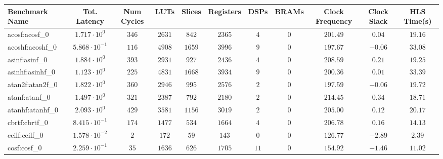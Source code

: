 \begin{tabular}{|l|c|c|c|c|c|c|c|c|c|c|}
\hline
Benchmark Name               & Tot. Latency            & Num Cycles & LUTs      & Slices    & Registers & DSPs    & BRAMs & Clock Frequency & Clock Slack & HLS Time(s) \\
\hline
acosf:acosf\_0               & $ 1.717 \cdot 10^{0}  $ & $ 346    $ & $ 2631  $ & $ 842   $ & $ 2365  $ & $ 4   $ & $ 0 $ & $ 201.49      $ & $ 0.04    $ & $ 19.16   $ \\
acoshf:acoshf\_0             & $ 5.868 \cdot 10^{-1} $ & $ 116    $ & $ 4908  $ & $ 1659  $ & $ 3996  $ & $ 9   $ & $ 0 $ & $ 197.67      $ & $ -0.06   $ & $ 33.08   $ \\
asinf:asinf\_0               & $ 1.884 \cdot 10^{0}  $ & $ 393    $ & $ 2931  $ & $ 927   $ & $ 2436  $ & $ 4   $ & $ 0 $ & $ 208.59      $ & $ 0.21    $ & $ 19.25   $ \\
asinhf:asinhf\_0             & $ 1.123 \cdot 10^{0}  $ & $ 225    $ & $ 4831  $ & $ 1668  $ & $ 3934  $ & $ 9   $ & $ 0 $ & $ 200.36      $ & $ 0.01    $ & $ 33.39   $ \\
atan2f:atan2f\_0             & $ 1.822 \cdot 10^{0}  $ & $ 360    $ & $ 2946  $ & $ 995   $ & $ 2576  $ & $ 2   $ & $ 0 $ & $ 197.59      $ & $ -0.06   $ & $ 19.72   $ \\
atanf:atanf\_0               & $ 1.497 \cdot 10^{0}  $ & $ 321    $ & $ 2387  $ & $ 792   $ & $ 2180  $ & $ 2   $ & $ 0 $ & $ 214.45      $ & $ 0.34    $ & $ 18.71   $ \\
atanhf:atanhf\_0             & $ 2.093 \cdot 10^{0}  $ & $ 429    $ & $ 3581  $ & $ 1156  $ & $ 3019  $ & $ 2   $ & $ 0 $ & $ 205.00      $ & $ 0.12    $ & $ 20.17   $ \\
cbrtf:cbrtf\_0               & $ 8.415 \cdot 10^{-1} $ & $ 174    $ & $ 1477  $ & $ 534   $ & $ 1664  $ & $ 4   $ & $ 0 $ & $ 206.78      $ & $ 0.16    $ & $ 14.13   $ \\
ceilf:ceilf\_0               & $ 1.578 \cdot 10^{-2} $ & $ 2      $ & $ 172   $ & $ 59    $ & $ 143   $ & $ 0   $ & $ 0 $ & $ 126.77      $ & $ -2.89   $ & $ 2.39    $ \\
cosf:cosf\_0                 & $ 2.259 \cdot 10^{-1} $ & $ 35     $ & $ 1636  $ & $ 626   $ & $ 1705  $ & $ 11  $ & $ 0 $ & $ 154.92      $ & $ -1.46   $ & $ 11.02   $ \\

\end{tabular}
